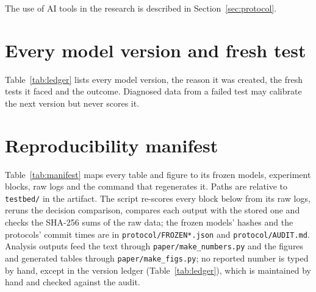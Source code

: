 \documentclass[acmsmall,review,nonacm]{acmart}
\begin{document}
\begin{acks}
The use of AI tools in the research is described in Section~\ref{sec:protocol}.
\end{acks}




\appendix
\section{Every model version and fresh test}
\label{app:ledger}
Table~\ref{tab:ledger} lists every model version, the reason it was created, the fresh tests it faced and the outcome. Diagnosed data from a failed test may calibrate the next version but never scores it.
{\footnotesize

}

\section{Reproducibility manifest}
\label{app:manifest}
Table~\ref{tab:manifest} maps every table and figure to its frozen models, experiment blocks, raw logs and the command that regenerates it. Paths are relative to \texttt{testbed/} in the artifact. The script  re-scores every block below from its raw logs, reruns the decision comparison, compares each output with the stored one and checks the SHA-256 sums of the raw data; the frozen models' hashes and the protocols' commit times are in \texttt{protocol/FROZEN*.json} and \texttt{protocol/AUDIT.md}. Analysis outputs feed the text through \texttt{paper/make\_numbers.py} and the figures and generated tables through \texttt{paper/make\_figs.py}; no reported number is typed by hand, except in the version ledger (Table~\ref{tab:ledger}), which is maintained by hand and checked against the audit.
\end{document}
